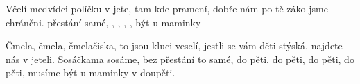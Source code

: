 \begin{TEXT}{Včelí medvídci}
\SLOKA {} políčku v jete, 
tam kde  pramení, 
dobře  nám po tě 
záko jsme chráněni. 
  
 přestání  samé, 
 ,  ,  ,  , 
 být u maminky  

\SLOKA Čmela, čmela, čmelačiska, 
to jsou kluci veselí, 
jestli se vám děti stýská, 
najdete nás v jeteli. 
Sosáčkama sosáme, 
bez přestání to samé, 
do pěti, do pěti, do pěti, do pěti, 
musíme být u maminky v doupěti.
\end{TEXT}